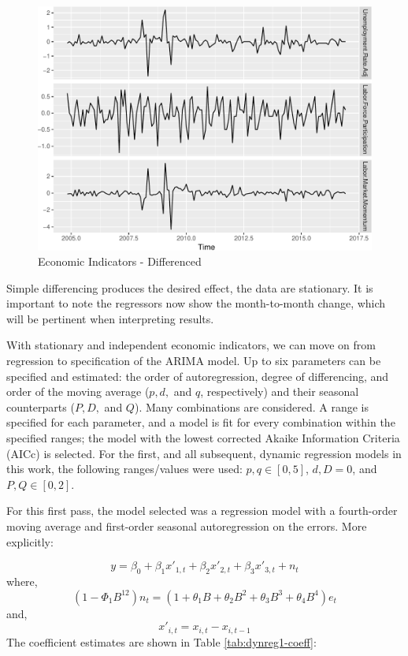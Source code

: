 \documentclass[12pt,letterpaper,toc=flat,oneside]{report}
\theoremstyle{definition}
\theoremstyle{definition}
\theoremstyle{definition}
\theoremstyle{remark}
\begin{document}
\begin{figure}[H]

{\centering \includegraphics{elliott-econometric-personnel-retention-18_files/figure-latex/econ-vars-2-1} 

}

\caption{Economic Indicators - Differenced}\label{fig:econ-vars-2}
\end{figure}

Simple differencing produces the desired effect, the data are
stationary. It is important to note the regressors now show the
month-to-month change, which will be pertinent when interpreting
results.

With stationary and independent economic indicators, we can move on from
regression to specification of the ARIMA model. Up to six parameters can
be specified and estimated: the order of autoregression, degree of
differencing, and order of the moving average (\(p,d,\) and \(q\),
respectively) and their seasonal counterparts (\(P,D,\) and \(Q\)). Many
combinations are considered. A range is specified for each parameter,
and a model is fit for every combination within the specified ranges;
the model with the lowest corrected Akaike Information Criteria (AICc)
is selected. For the first, and all subsequent, dynamic regression
models in this work, the following ranges/values were used:
\(p,q \in [0,5]\), \(d,D = 0\), and \(P, Q \in [0,2]\).

For this first pass, the model selected was a regression model with a
fourth-order moving average and first-order seasonal autoregression on
the errors. More explicitly:

\[ y = \beta_0 + \beta_1x'_{1,t} + \beta_2x'_{2,t} + \beta_3x'_{3,t} + n_t\]
where,
\[ (1-\Phi_1 B^{12})n_t = (1 + \theta_1B + \theta_2B^2 + \theta_3B^3 + \theta_4 B^4)e_t \]
and, \[ x'_{i,t} = x_{i,t} - x_{i,t-1}\] The coefficient estimates are
shown in Table \ref{tab:dynreg1-coeff}:
\end{document}
